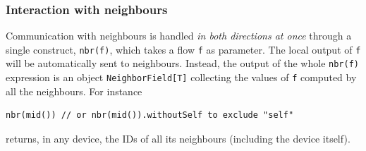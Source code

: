 \subsubsection{Interaction with neighbours}
%
Communication with neighbours is handled \emph{in both directions at once} through a single construct, \lstinline|nbr(f)|, which takes a flow \texttt{f} as parameter.
%
The local output of \texttt{f} will be automatically sent to neighbours.
%
Instead, the output of the whole \lstinline|nbr(f)| expression
 is an object \lstinline|NeighborField[T]|
 collecting the values of \texttt{f} computed by all the neighbours.
%
For instance
%
\begin{lstlisting}
nbr(mid()) // or nbr(mid()).withoutSelf to exclude "self"
\end{lstlisting}
%
returns, in any device, the IDs of all its neighbours (including the device itself).
%
%
%
%
%
%

